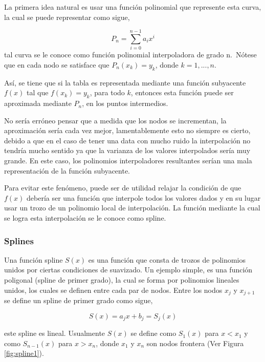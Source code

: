 \documentclass[
  12pt,
]{krantz}
\begin{document}
La primera idea natural es usar una función polinomial que represente esta curva, la cual se puede representar como sigue,

\[\displaystyle{P_{n} = \sum_{i=0}^{n-1} a_{i}x^{i}}\]
tal curva se le conoce como función polinomial interpoladora de grado n.~Nótese que en cada nodo se satisface que \(P_{n}(x_{k})=y_{k}\), donde \(k=1,...,n\).

Así, se tiene que si la tabla es representada mediante una función subyacente \(f(x)\) tal que \(f(x_{k})=y_{k}\), para todo \(k\), entonces esta función puede ser aproximada mediante \(P_{n}\), en los puntos intermedios.

No sería erróneo pensar que a medida que los nodos se incrementan, la aproximación sería cada vez mejor, lamentablemente esto no siempre es cierto, debido a que en el caso de tener una data con mucho ruido la interpolación no tendría mucho sentido ya que la varianza de los valores interpolados sería muy grande. En este caso, los polinomios interpoladores resultantes serían una mala representación de la función subyacente.

Para evitar este fenómeno, puede ser de utilidad relajar la condición de que \(f(x)\) debería ser una función que interpole todos los valores dados y en su lugar usar un trozo de un polinomio local de interpolación. La función mediante la cual se logra esta interpolación se le conoce como spline.

\hypertarget{splines}{%
\subsubsection{Splines}\label{splines}}

Una función spline \(S(x)\) es una función que consta de trozos de polinomios unidos por ciertas condiciones de suavizado. Un ejemplo simple, es una función poligonal (spline de primer grado), la cual se forma por polinomios lineales unidos, los cuales se definen entre cada par de nodos. Entre los nodos \(x_{j}\) y \(x_{j+1}\) se define un spline de primer grado como sigue,

\[\displaystyle{S(x) = a_{j}x + b_{j} = S_{j}(x)}\]

este spline es lineal. Usualmente \(S(x)\) se define como \(S_{1}(x)\) para \(x<x_{1}\) y como \(S_{n-1}(x)\) para \(x>x_{n}\), donde \(x_{1}\) y \(x_{n}\) son nodos frontera (Ver Figura \ref{fig:spline1}).
\end{document}
